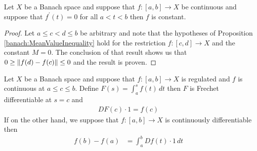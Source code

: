 \begin{cor}\label{banach:DerivativeZeroRealDomain}Let
  $X$ be a Banach space and suppose that $f : [a,b] \to X$ be continuous and suppose that
  $f^\prime(t) = 0$ for all $a < t < b$ then $f$ is constant.
\end{cor}
\begin{proof}
  Let $a \leq c < d \leq b$ be arbitrary and note that the hypotheses of Proposition \ref{banach:MeanValueInequality} hold for
  the restriction $f : [c,d] \to X$ and the constant $M = 0$.   The conclusion of that result shows us that
  $0 \geq \left \lVert f(d) - f(c) \right \rVert \leq 0$ and the result is proven.
\end{proof}

\begin{thm}\label{FundamentalTheoremOfCalculusForBanachSpaceRiemannIntegrals}Let
  $X$ be a Banach space and suppose that $f : [a,b] \to X$ is regulated and $f$ is continuous at $a \leq c \leq b$.
  Define $F(s) = \int_a^s f(t) \, dt$ then $F$ is Frechet differentiable at $s = c$ and
  \begin{align*}
    DF(c) \cdot 1 = f(c)
  \end{align*}
If on the other hand, we suppose that $f : [a,b] \to X$ is continuously
 differentiable then 
\begin{align*}
f(b) - f(a) &= \int_a^b Df(t) \cdot 1 \, dt
\end{align*}
\end{thm}
